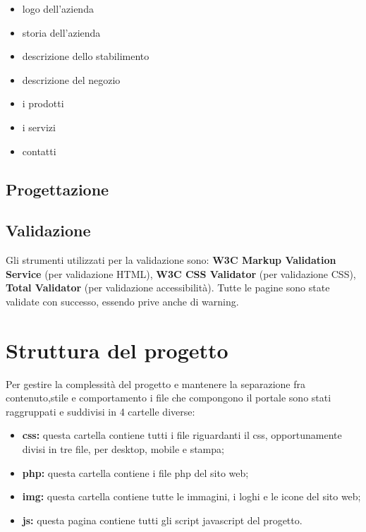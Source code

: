 \begin{itemize}
	\item logo dell'azienda 
	\item storia dell'azienda 
	\item descrizione dello stabilimento 
	\item descrizione del negozio
	\item i prodotti
	\item i servizi
	\item contatti
\end{itemize} 

\subsection{Progettazione}

\subsection{Validazione}

Gli strumenti utilizzati per la validazione sono: \textbf{W3C Markup Validation Service} (per validazione HTML), \textbf{W3C CSS Validator} (per validazione CSS), \textbf{Total Validator} (per validazione accessibilità).
Tutte le pagine sono state validate con successo, essendo prive anche di warning.




\section{Struttura del progetto}

Per gestire la complessità del progetto e mantenere la separazione fra contenuto,stile e comportamento i file che compongono il portale sono stati raggruppati e suddivisi in 4 cartelle diverse:

\begin{itemize}
	\item \textbf{css:} questa cartella contiene tutti i file riguardanti il css, opportunamente divisi in tre file, per desktop, mobile e stampa;
	\item \textbf{php:} questa cartella contiene i file php del sito web;
	\item \textbf{img:} questa cartella contiene tutte le immagini, i loghi e le icone del sito web;
	\item \textbf{js:}  questa pagina contiene tutti gli script javascript del progetto.
\end{itemize}

